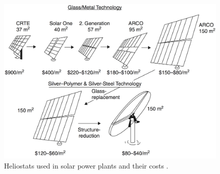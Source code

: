 \documentclass[Master,MEE,english]{twbook}%
\begin{document}
\begin{figure}[!h] 
\centering
\includegraphics[width=0.9\linewidth]{FIG/Heliostats}
\caption[Heliostats used in solar power plants and their costs.]{Heliostats used in solar power plants and their costs \cite{Kolb2007}.}\label{Heliostats}
\end{figure}
\end{document}

